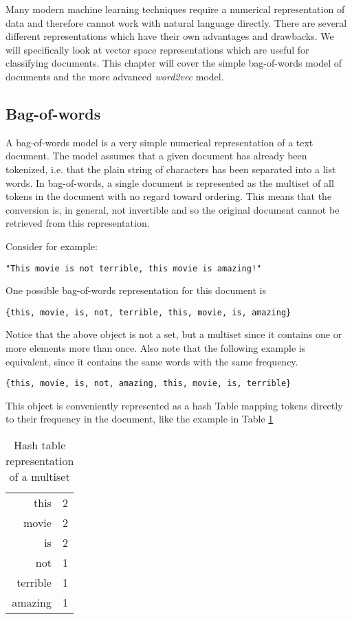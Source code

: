 Many modern machine learning techniques require a numerical representation of data and therefore cannot work with natural language directly.  There are several different representations which have their own advantages and drawbacks.  We will specifically look at vector space representations which are useful for classifying documents.  This chapter will cover the simple bag-of-words model of documents and the more advanced \textit{word2vec} model.

\subsection{Bag-of-words} \label{sec:bow}
A bag-of-words model is a very simple numerical representation of a text document.  The model assumes that a given document has already been tokenized, i.e. that the plain string of characters has been separated into a list words.  In bag-of-words, a single document is represented as the multiset of all tokens in the document with no regard toward ordering.  This means that the conversion is, in general, not invertible and so the original document cannot be retrieved from this representation.

Consider for example:
\begin{center}
\texttt{"This movie is not terrible, this movie is amazing!"}
\end{center}
One possible bag-of-words representation for this document is
\begin{center}
\texttt{\{this, movie, is, not, terrible, this, movie, is, amazing\}}
\end{center}
Notice that the above object is not a set, but a multiset since it contains one or more elements more than once.  Also note that the following example is equivalent, since it contains the same words with the same frequency.
\begin{center}
\texttt{\{this, movie, is, not, amazing, this, movie, is, terrible\}}
\end{center}

This object is conveniently represented as a hash Table mapping tokens directly to their frequency in the document, like the example in Table \ref{tab:hash}
\begin{table}
\centering
\begin{tabular}{ r l }
 this & 2 \\ 
 movie & 2 \\  
 is & 2 \\ 
 not & 1 \\
 terrible & 1 \\
 amazing & 1 \\
\end{tabular}
\caption{Hash table representation of a multiset}
\label{tab:hash}
\end{table}

